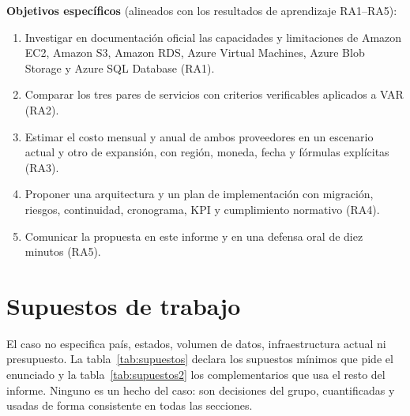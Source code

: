 \documentclass[11pt,letterpaper]{article}
\begin{document}
\textbf{Objetivos específicos} (alineados con los resultados de aprendizaje RA1–RA5):
\begin{enumerate}
  \item Investigar en documentación oficial las capacidades y limitaciones de Amazon EC2, Amazon S3, Amazon RDS, Azure Virtual Machines, Azure Blob Storage y Azure SQL Database (RA1).
  \item Comparar los tres pares de servicios con criterios verificables aplicados a VAR (RA2).
  \item Estimar el costo mensual y anual de ambos proveedores en un escenario actual y otro de expansión, con región, moneda, fecha y fórmulas explícitas (RA3).
  \item Proponer una arquitectura y un plan de implementación con migración, riesgos, continuidad, cronograma, KPI y cumplimiento normativo (RA4).
  \item Comunicar la propuesta en este informe y en una defensa oral de diez minutos (RA5).
\end{enumerate}

\section{Supuestos de trabajo}\label{sec:supuestos}
El caso no especifica país, estados, volumen de datos, infraestructura actual ni presupuesto. La tabla~\ref{tab:supuestos} declara los supuestos mínimos que pide el enunciado y la tabla~\ref{tab:supuestos2} los complementarios que usa el resto del informe. Ninguno es un hecho del caso: son decisiones del grupo, cuantificadas y usadas de forma consistente en todas las secciones.
\end{document}

